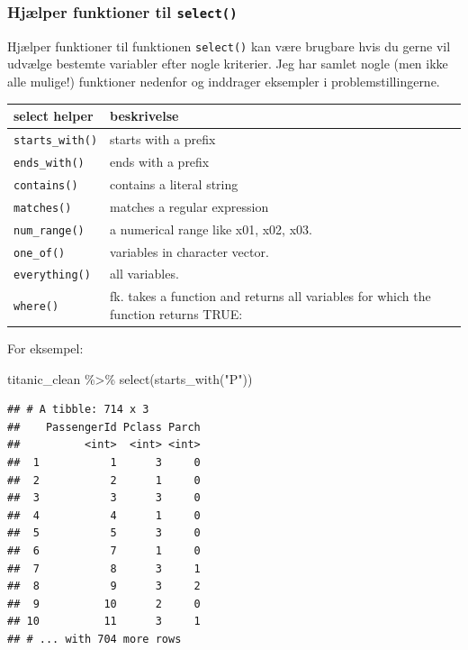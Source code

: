\documentclass[
]{book}
\newenvironment{Shaded}{\begin{snugshade}}{\end{snugshade}}
\newcommand{\FunctionTok}[1]{\textcolor[rgb]{0.00,0.00,0.00}{#1}}
\newcommand{\NormalTok}[1]{#1}
\newcommand{\SpecialCharTok}[1]{\textcolor[rgb]{0.00,0.00,0.00}{#1}}
\newcommand{\StringTok}[1]{\textcolor[rgb]{0.31,0.60,0.02}{#1}}
\begin{document}
\hypertarget{hjuxe6lper-funktioner-til-select}{%
\subsubsection{\texorpdfstring{Hjælper funktioner til \texttt{select()}}{Hjælper funktioner til select()}}\label{hjuxe6lper-funktioner-til-select}}

Hjælper funktioner til funktionen \texttt{select()} kan være brugbare hvis du gerne vil udvælge bestemte variabler efter nogle kriterier. Jeg har samlet nogle (men ikke alle mulige!) funktioner nedenfor og inddrager eksempler i problemstillingerne.

\begin{longtable}[]{@{}
  >{\raggedright\arraybackslash}p{}
  >{\raggedright\arraybackslash}p{}@{}}
\toprule
select helper & beskrivelse \\
\midrule
\endhead
\texttt{starts\_with()} & starts with a prefix \\
\texttt{ends\_with()} & ends with a prefix \\
\texttt{contains()} & contains a literal string \\
\texttt{matches()} & matches a regular expression \\
\texttt{num\_range()} & a numerical range like x01, x02, x03. \\
\texttt{one\_of()} & variables in character vector. \\
\texttt{everything()} & all variables. \\
\texttt{where()} & fk. takes a function and returns all variables for which the function returns TRUE: \\
\bottomrule
\end{longtable}

For eksempel:

\begin{Shaded}
\begin{Highlighting}[]
\NormalTok{titanic\_clean }\SpecialCharTok{\%\textgreater{}\%} \FunctionTok{select}\NormalTok{(}\FunctionTok{starts\_with}\NormalTok{(}\StringTok{"P"}\NormalTok{))}
\end{Highlighting}
\end{Shaded}

\begin{verbatim}
## # A tibble: 714 x 3
##    PassengerId Pclass Parch
##          <int>  <int> <int>
##  1           1      3     0
##  2           2      1     0
##  3           3      3     0
##  4           4      1     0
##  5           5      3     0
##  6           7      1     0
##  7           8      3     1
##  8           9      3     2
##  9          10      2     0
## 10          11      3     1
## # ... with 704 more rows
\end{verbatim}
\end{document}
